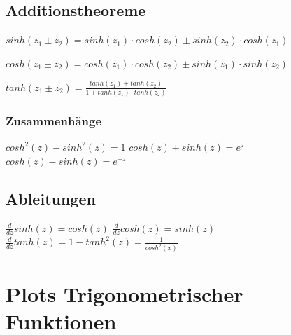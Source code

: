 \subsection{Additionstheoreme}
$sinh(z_1 \pm z_2) = sinh(z_1) \cdot cosh(z_2) \pm sinh(z_2) \cdot cosh(z_1)$

$cosh(z_1 \pm z_2) = cosh(z_1) \cdot cosh(z_2) \pm sinh(z_1) \cdot sinh(z_2)$

$tanh(z_1 \pm z_2) = \frac{tanh(z_1) \pm tanh(z_2)}{1 \pm tanh(z_1) \cdot tanh(z_2)}$


\subsubsection{Zusammenhänge}
$cosh^2(z) - sinh^2(z) = 1$ \hfill $cosh(z) + sinh(z) = e^z$ \hfill $cosh(z) - sinh(z) = e^{-z}$

\subsection{Ableitungen}
$\frac{d}{dz}sinh(z) = cosh(z)$ \hfill $\frac{d}{dz}cosh(z) = sinh(z)$ \hfill $\frac{d}{dz}tanh(z) = 1 -tanh^2(z) = \frac{1}{cosh^2(x)}$

\section{Plots Trigonometrischer Funktionen}

